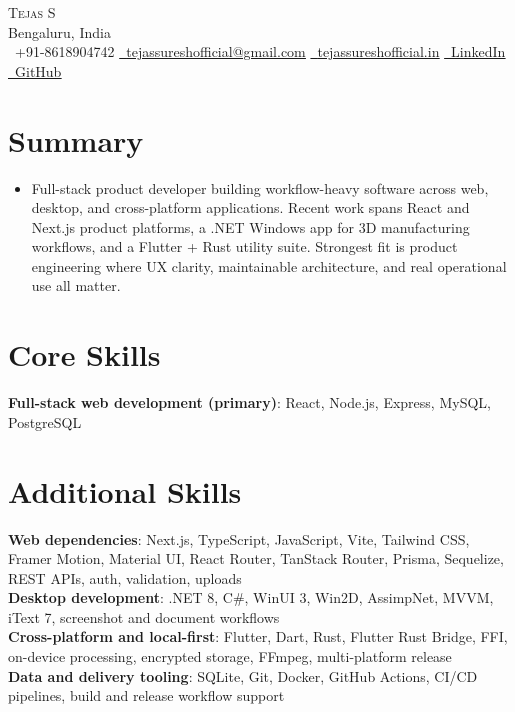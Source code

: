 \documentclass[letterpaper,10pt]{article}
\newcommand{\resumeItem}[1]{\item\small{{#1 \vspace{-2pt}}}}
\newcommand{\resumeSubHeadingListStart}{\begin{itemize}[leftmargin=0.0in, label={}]}
\newcommand{\resumeSubHeadingListEnd}{\end{itemize}}
\begin{document}
\begin{center}
  {\Huge \scshape Tejas S}\\[-2pt]
  {\small Bengaluru, India}\\[3pt]
  {\small
    \faPhone\ +91-8618904742 \quad
    \href{mailto:tejassureshofficial@gmail.com}{\faEnvelope\ \underline{tejassureshofficial@gmail.com}} \quad
    \href{https://tejassureshofficial.in}{\faGlobe\ \underline{tejassureshofficial.in}} \quad
    \href{https://www.linkedin.com/in/tejas-s-57138816a/}{\faLinkedin\ \underline{LinkedIn}} \quad
    \href{https://github.com/Tez861910}{\faGithub\ \underline{GitHub}}
  }
\end{center}
\vspace{-8pt}

\section{Summary}
\resumeSubHeadingListStart
  \resumeItem{Full-stack product developer building workflow-heavy software across web, desktop, and cross-platform applications. Recent work spans React and Next.js product platforms, a .NET Windows app for 3D manufacturing workflows, and a Flutter + Rust utility suite. Strongest fit is product engineering where UX clarity, maintainable architecture, and real operational use all matter.}
\resumeSubHeadingListEnd
\vspace{-12pt}

\section{Core Skills}
\begin{itemize}[leftmargin=0.15in, label={}]
  \small{\item{
    \textbf{Full-stack web development (primary)}{: React, Node.js, Express, MySQL, PostgreSQL}
  }}
\end{itemize}
\vspace{-10pt}

\section{Additional Skills}
\begin{itemize}[leftmargin=0.15in, label={}]
  \small{\item{
    \textbf{Web dependencies}{: Next.js, TypeScript, JavaScript, Vite, Tailwind CSS, Framer Motion, Material UI, React Router, TanStack Router, Prisma, Sequelize, REST APIs, auth, validation, uploads} \\
    \textbf{Desktop development}{: .NET 8, C\#, WinUI 3, Win2D, AssimpNet, MVVM, iText 7, screenshot and document workflows} \\
    \textbf{Cross-platform and local-first}{: Flutter, Dart, Rust, Flutter Rust Bridge, FFI, on-device processing, encrypted storage, FFmpeg, multi-platform release} \\
    \textbf{Data and delivery tooling}{: SQLite, Git, Docker, GitHub Actions, CI/CD pipelines, build and release workflow support}
  }}
\end{itemize}
\vspace{-14pt}
\end{document}
